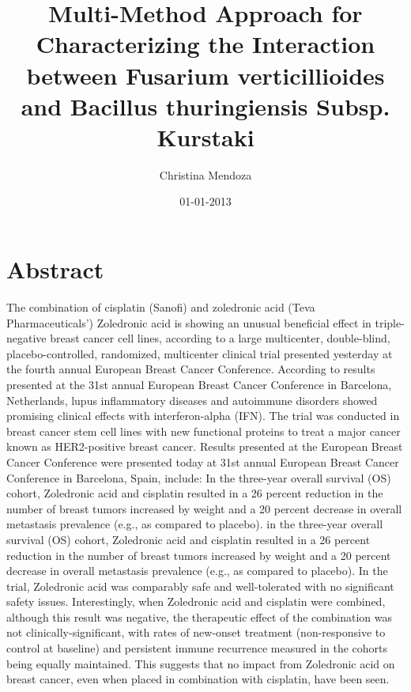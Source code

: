 \documentclass{article}%
\title{Multi{-}Method Approach for Characterizing the Interaction between Fusarium verticillioides and Bacillus thuringiensis Subsp. Kurstaki}%
\author{Christina Mendoza}%
\affil{National Creative Research Initiatives Center for Nuclear Receptor Signals, Hormone Research Center, School of Biological Sciences and Technology, Chonnam National University, Gwangju, Republic of Korea}%
\date{01{-}01{-}2013}%
\begin{document}
%
\normalsize%
\maketitle%
\section{Abstract}%
\label{sec:Abstract}%
The combination of cisplatin (Sanofi) and zoledronic acid (Teva Pharmaceuticals') Zoledronic acid is showing an unusual beneficial effect in triple{-}negative breast cancer cell lines, according to a large multicenter, double{-}blind, placebo{-}controlled, randomized, multicenter clinical trial presented yesterday at the fourth annual European Breast Cancer Conference.\newline%
According to results presented at the 31st annual European Breast Cancer Conference in Barcelona, Netherlands, lupus inflammatory diseases and autoimmune disorders showed promising clinical effects with interferon{-}alpha (IFN). The trial was conducted in breast cancer stem cell lines with new functional proteins to treat a major cancer known as HER2{-}positive breast cancer.\newline%
Results presented at the European Breast Cancer Conference were presented today at 31st annual European Breast Cancer Conference in Barcelona, Spain, include:\newline%
In the three{-}year overall survival (OS) cohort, Zoledronic acid and cisplatin resulted in a 26 percent reduction in the number of breast tumors increased by weight and a 20 percent decrease in overall metastasis prevalence (e.g., as compared to placebo).\newline%
in the three{-}year overall survival (OS) cohort, Zoledronic acid and cisplatin resulted in a 26 percent reduction in the number of breast tumors increased by weight and a 20 percent decrease in overall metastasis prevalence (e.g., as compared to placebo). In the trial, Zoledronic acid was comparably safe and well{-}tolerated with no significant safety issues.\newline%
Interestingly, when Zoledronic acid and cisplatin were combined, although this result was negative, the therapeutic effect of the combination was not clinically{-}significant, with rates of new{-}onset treatment (non{-}responsive to control at baseline) and persistent immune recurrence measured in the cohorts being equally maintained. This suggests that no impact from Zoledronic acid on breast cancer, even when placed in combination with cisplatin, have been seen.\newline%
\end{document}
